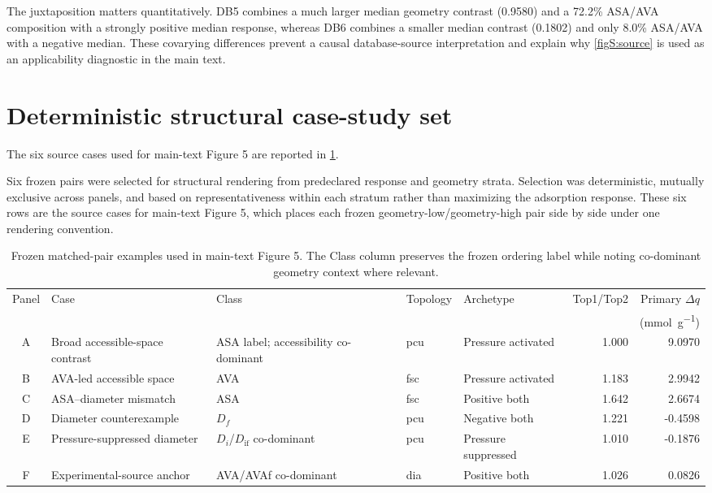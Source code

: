 \documentclass[11pt,a4paper]{article}
\begin{document}
The juxtaposition matters quantitatively. DB5 combines a much larger median geometry
contrast (0.9580) and a 72.2\% ASA/AVA composition with a strongly positive median
response, whereas DB6 combines a smaller median contrast (0.1802) and only 8.0\%
ASA/AVA with a negative median. These covarying differences prevent a causal
database-source interpretation and explain why \cref{figS:source} is used as an
applicability diagnostic in the main text.

\section{Deterministic structural case-study set}
\label{sec:structures}

The six source cases used for main-text Figure 5 are reported in \cref{tab:S33}.


Six frozen pairs were selected for structural rendering from predeclared response
and geometry strata. Selection was deterministic, mutually exclusive across panels,
and based on representativeness within each stratum rather than maximizing the
adsorption response. These six rows are the source cases for main-text Figure 5,
which places each frozen geometry-low/geometry-high pair side by side under one
rendering convention.

\begin{landscape}
\begin{table}[H]
\centering
\scriptsize
\caption{Frozen matched-pair examples used in main-text Figure 5. The Class column preserves the frozen ordering label while noting co-dominant geometry context where relevant.}
\label{tab:S33}
\begin{tabular}{cllllrr}
\toprule
Panel & Case & Class & Topology & Archetype & Top1/Top2 & Primary $\Delta q$ \\
 & & & & & & (\si{\milli\mole\per\gram}) \\
\midrule
A & Broad accessible-space contrast & ASA label; accessibility co-dominant & pcu & Pressure activated & 1.000 & 9.0970 \\
B & AVA-led accessible space & AVA & fsc & Pressure activated & 1.183 & 2.9942 \\
C & ASA--diameter mismatch & ASA & fsc & Positive both & 1.642 & 2.6674 \\
D & Diameter counterexample & $D_f$ & pcu & Negative both & 1.221 & -0.4598 \\
E & Pressure-suppressed diameter & $D_i$/$D_{\mathrm{if}}$ co-dominant & pcu & Pressure suppressed & 1.010 & -0.1876 \\
F & Experimental-source anchor & AVA/AVAf co-dominant & dia & Positive both & 1.026 & 0.0826 \\
\bottomrule
\end{tabular}
\end{table}
\end{landscape}
\end{document}
